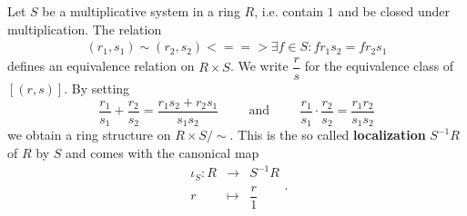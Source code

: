 	\begin{definition}
		Let $S$ be a multiplicative system in a ring $R$, i.e. contain $1$ and be closed under multiplication. The relation
		\begin{align*}
			(r_1,s_1) \sim (r_2,s_2) <==> \exists f\in S: fr_1s_2 = fr_2s_1
		\end{align*}
		defines an equivalence relation on $R \times S$. We write $\dfrac{r}{s}$ for the equivalence class of $[(r,s)]$. By setting
		\begin{equation*}
			\dfrac{r_1}{s_1} + \dfrac{r_2}{s_2} = \dfrac{r_1s_2 + r_2s_1}{s_1s_2} \hspace{1cm}\text{and}\hspace{1cm} \dfrac{r_1}{s_1} \cdot \dfrac{r_2}{s_2} = \dfrac{r_1r_2}{s_1s_2}
		\end{equation*}
		we obtain a ring structure on $R \times S / \sim$. This is the so called \textbf{localization} $S^{-1}R$ of $R$ by $S$ and comes with the canonical map
		\begin{equation*}
			\begin{array}{rcl}
				\iota_S:R & \longrightarrow & S^{-1}R\\
				r & \longmapsto & \dfrac{r}{1}
			\end{array}.
		\end{equation*}
	\end{definition}


